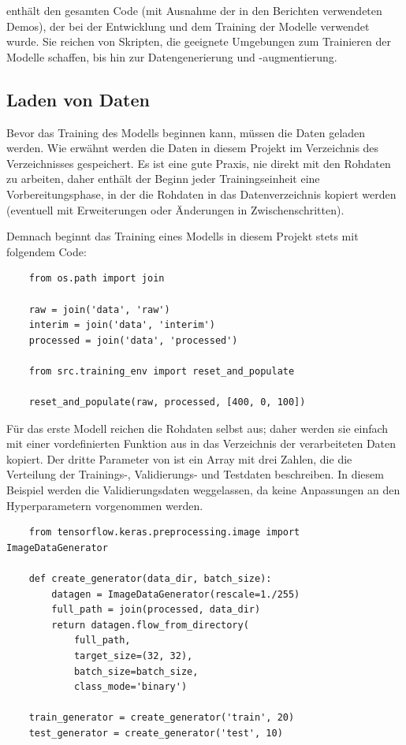  enthält den gesamten Code (mit Ausnahme der in den Berichten verwendeten Demos), der bei der Entwicklung und dem Training der Modelle verwendet wurde. Sie reichen von Skripten, die geeignete Umgebungen zum Trainieren der Modelle schaffen, bis hin zur Datengenerierung und -augmentierung.

\subsection{Laden von Daten}

Bevor das Training des Modells beginnen kann, müssen die Daten geladen werden.
Wie erwähnt werden die Daten in diesem Projekt im Verzeichnis  des Verzeichnisses  gespeichert.
Es ist eine gute Praxis, nie direkt mit den Rohdaten zu arbeiten, daher enthält der Beginn jeder Trainingseinheit eine Vorbereitungsphase, in der die Rohdaten in das  Datenverzeichnis kopiert werden (eventuell mit Erweiterungen oder Änderungen in Zwischenschritten).

Demnach beginnt das Training eines Modells in diesem Projekt stets mit folgendem Code:

\begin{lstlisting}
    from os.path import join
    
    raw = join('data', 'raw')
    interim = join('data', 'interim')
    processed = join('data', 'processed')
        
    from src.training_env import reset_and_populate
        
    reset_and_populate(raw, processed, [400, 0, 100])
\end{lstlisting}

Für das erste Modell reichen die Rohdaten selbst aus; daher werden sie einfach mit einer vordefinierten Funktion aus  in das Verzeichnis der verarbeiteten Daten kopiert.
Der dritte Parameter von  ist ein Array mit drei Zahlen, die die Verteilung der Trainings-, Validierungs- und Testdaten beschreiben.
In diesem Beispiel werden die Validierungsdaten weggelassen, da keine Anpassungen an den Hyperparametern vorgenommen werden.

\begin{lstlisting}
    from tensorflow.keras.preprocessing.image import ImageDataGenerator
    
    def create_generator(data_dir, batch_size):
        datagen = ImageDataGenerator(rescale=1./255)
        full_path = join(processed, data_dir)
        return datagen.flow_from_directory(
            full_path,
            target_size=(32, 32),
            batch_size=batch_size,
            class_mode='binary')
    
    train_generator = create_generator('train', 20)
    test_generator = create_generator('test', 10)
\end{lstlisting}

